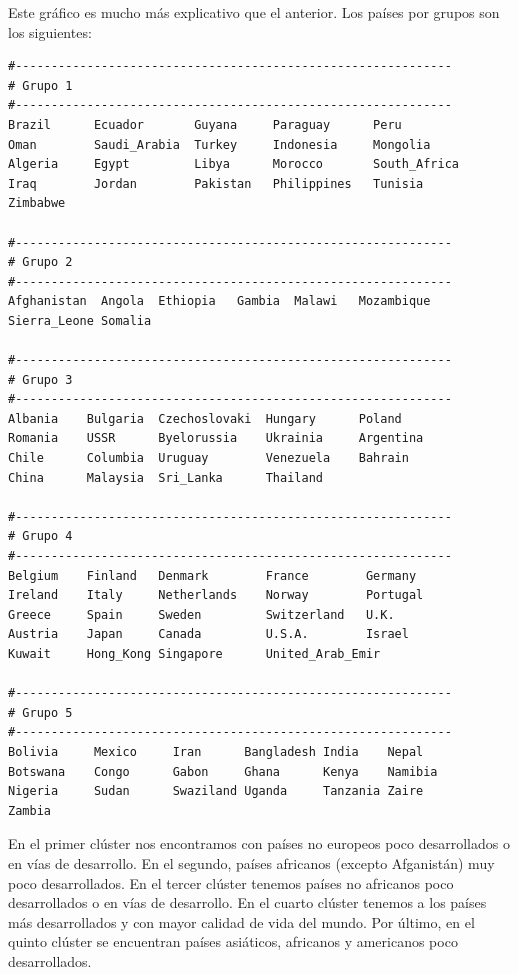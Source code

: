 \documentclass[12pt,a4paper,twoside,openright,titlepage,final]{article}
\begin{document}
Este gráfico es mucho más explicativo que el anterior. Los países por grupos son los siguientes:

\begin{verbatim}
#-------------------------------------------------------------
# Grupo 1
#-------------------------------------------------------------
Brazil      Ecuador       Guyana     Paraguay      Peru         
Oman        Saudi_Arabia  Turkey     Indonesia     Mongolia     
Algeria     Egypt         Libya      Morocco       South_Africa 
Iraq        Jordan        Pakistan   Philippines   Tunisia    
Zimbabwe 

#-------------------------------------------------------------
# Grupo 2
#-------------------------------------------------------------
Afghanistan  Angola  Ethiopia   Gambia  Malawi   Mozambique 
Sierra_Leone Somalia 

#-------------------------------------------------------------
# Grupo 3
#-------------------------------------------------------------
Albania    Bulgaria  Czechoslovaki  Hungary      Poland       
Romania    USSR      Byelorussia    Ukrainia     Argentina         
Chile      Columbia  Uruguay        Venezuela    Bahrain         
China      Malaysia  Sri_Lanka      Thailand 

#-------------------------------------------------------------
# Grupo 4
#-------------------------------------------------------------
Belgium    Finland   Denmark        France        Germany           
Ireland    Italy     Netherlands    Norway        Portugal            
Greece     Spain     Sweden         Switzerland   U.K.          
Austria    Japan     Canada         U.S.A.        Israel           
Kuwait     Hong_Kong Singapore      United_Arab_Emir 

#-------------------------------------------------------------
# Grupo 5
#-------------------------------------------------------------
Bolivia     Mexico     Iran      Bangladesh India    Nepal   
Botswana    Congo      Gabon     Ghana      Kenya    Namibia    
Nigeria     Sudan      Swaziland Uganda     Tanzania Zaire 
Zambia 
\end{verbatim}

En el primer clúster nos encontramos con países no europeos poco desarrollados o en vías de desarrollo. En el segundo, países africanos (excepto Afganistán) muy poco desarrollados. En el tercer clúster tenemos países no africanos poco desarrollados o en vías de desarrollo. En el cuarto clúster tenemos a los países más desarrollados y con mayor calidad de vida del mundo. Por último, en el quinto clúster se encuentran países asiáticos, africanos y americanos poco desarrollados.
\end{document}
